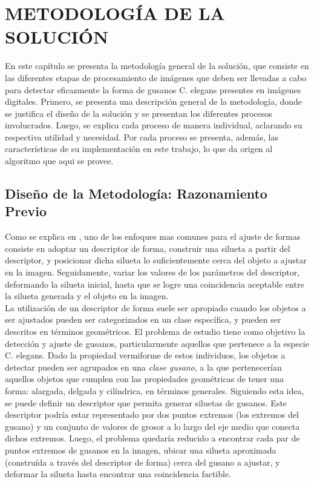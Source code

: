 \thispagestyle{empty}
\cleardoublepage  
\chapter{METODOLOG\'IA DE LA SOLUCI\'ON}
\label{chap:methodology}

En este cap\'itulo se presenta la metodolog\'ia general de la soluci\'on,
que consiste en las diferentes etapas de procesamiento de im\'agenes que deben ser
llevadas a cabo para detectar eficazmente la forma de gusanos C. elegans presentes
en im\'agenes digitales. Primero, se presenta una descripci\'on general de la 
metodolog\'ia, donde se justifica el dise\~no de la soluci\'on y se presentan los 
diferentes procesos involucrados.
Luego, se explica cada proceso de manera individual, aclarando su respectiva utilidad y necesidad.
Por cada proceso se presenta, adem\'as, las caracter\'isticas de su implementaci\'on en este trabajo,
lo que da origen al algoritmo que aqui se provee.

\section{Dise\~no de la Metodolog\'ia: Razonamiento Previo}
\label{sec:reasoning}

Como se explica en \cite{binaryshape,deformable,matching2,matchingbook},
uno de los enfoques mas comunes para el ajuste de formas consiste en adoptar
un descriptor de forma, construir una silueta a partir del descriptor,
y posicionar dicha silueta lo suficientemente cerca del objeto a ajustar en
la imagen. Seguidamente, variar los valores de los par\'ametros 
del descriptor, deformando la silueta inicial, hasta que se logre una 
coincidencia aceptable entre la silueta generada y el objeto en la imagen.\\
 
La utilizaci\'on de un descriptor de forma suele ser apropiado
cuando los objetos a ser ajustados pueden ser categorizados
en un clase espec\'ifica, y pueden ser descritos
en t\'erminos geom\'etricos.
El problema de estudio tiene como objetivo la detecci\'on y ajuste
de gusanos, particularmente aquellos que pertenece a la especie
C. elegans. Dado la propiedad vermiforme de estos individuos, los
objetos a detectar pueden ser agrupados en una \emph{clase gusano},
a la que pertenecer\'ian aquellos objetos que cumplen con las propiedades
geom\'etricas de tener una forma: alargada, delgada y cil\'indrica, en
t\'erminos generales.
Siguiendo esta idea, se puede definir un descriptor que 
permita generar siluetas de gusanos. Este descriptor podr\'ia
estar representado por dos puntos extremos (los extremos del gusano)
y un conjunto de valores de grosor a lo largo del eje medio que
conecta dichos extremos. Luego, el problema quedar\'ia
reducido a encontrar cada par de puntos extremos de gusanos en la
imagen, ubicar una silueta aproximada (constru\'ida a trav\'es
del descriptor de forma) cerca del gusano a ajustar, y deformar 
la silueta hasta encontrar una coincidencia factible.\\

